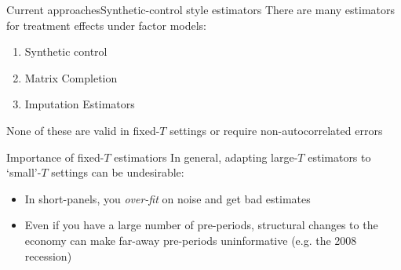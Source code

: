 \documentclass[aspectratio=169,t,11pt]{beamer}
\begin{document}
%   
%     
% 

\begin{frame}{Current approaches}{Synthetic-control style estimators}
  There are many estimators for treatment effects under factor models:
  \begin{enumerate}
    \item Synthetic control 
    \item Matrix Completion 
    \item Imputation Estimators 
  \end{enumerate}

  \bigskip
  None of these are valid in fixed-$T$ settings or require non-autocorrelated errors
\end{frame}

\begin{frame}{Importance of fixed-$T$ estimatiors}
  In general, adapting large-$T$ estimators to `small'-$T$ settings can be undesirable:
  
  \begin{itemize}
    \item In short-panels, you \emph{over-fit} on noise and get bad estimates 
    
    \item Even if you have a large number of pre-periods, structural changes to the economy can make far-away pre-periods uninformative (e.g. the 2008 recession) 
  \end{itemize}
\end{frame}
\end{document}
